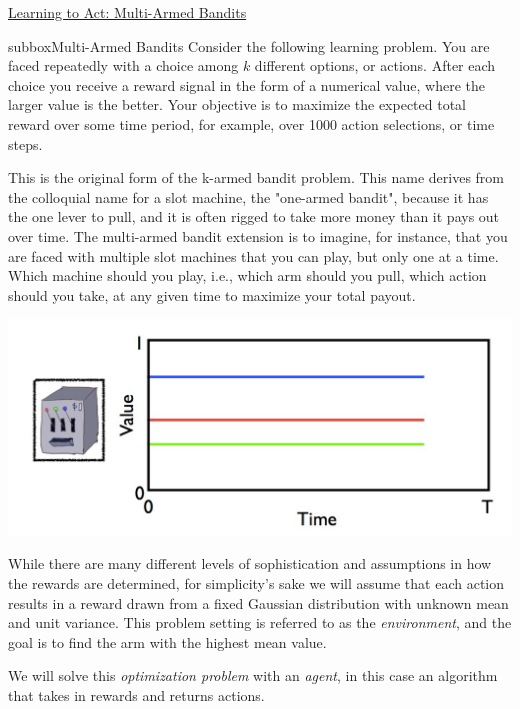 \begin{textbox}{\href{https://compneuro.neuromatch.io/tutorials/W3D4_ReinforcementLearning/student/W3D4_Tutorial2.html}{Learning to Act: Multi-Armed Bandits } }
\begin{subbox}{subbox}{Multi-Armed Bandits}
\scriptsize
Consider the following learning problem. You are faced repeatedly with a choice among $k$ different options, or actions. After each choice you receive a reward signal in the form of a numerical value, where the larger value is the better. Your objective is to maximize the expected total reward over some time period, for example, over 1000 action selections, or time steps.

This is the original form of the k-armed bandit problem. This name derives from the colloquial name for a slot machine, the "one-armed bandit", because it has the one lever to pull, and it is often rigged to take more money than it pays out over time. The multi-armed bandit extension is to imagine, for instance, that you are faced with multiple slot machines that you can play, but only one at a time. Which machine should you play, i.e., which arm should you pull, which action should you take, at any given time to maximize your total payout.


\begin{center}
    
\includegraphics[scale=0.18]{Figures/RL/RL_Figure7.png}
\end{center}
While there are many different levels of sophistication and assumptions in how the rewards are determined, for simplicity's sake we will assume that each action results in a reward drawn from a fixed Gaussian distribution with unknown mean and unit variance. This problem setting is referred to as the \textit{environment}, and the goal is to find the arm with the highest mean value.

We will solve this \textit{optimization problem} with an \textit{agent}, in this case an algorithm that takes in rewards and returns actions.

\end{subbox}
\end{textbox}
